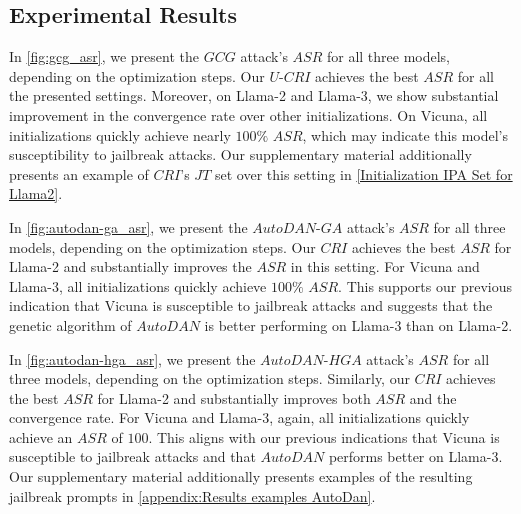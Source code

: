 \subsection{Experimental Results}
\label{subsec:exp_results}

In \cref{fig:gcg_asr}, we present the $GCG$ attack’s $ASR$ for all three models, depending on the optimization steps. Our $U\text{-}CRI$ achieves the best $ASR$ for all the presented settings. Moreover, on Llama-2 and Llama-3, we show substantial improvement in the convergence rate over other initializations. On Vicuna, all initializations quickly achieve nearly $100\%$ $ASR$, which may indicate this model's susceptibility to jailbreak attacks. Our supplementary material additionally presents an example of $CRI$'s $JT$ set over this setting in \cref{Initialization IPA Set for Llama2}.

In \cref{fig:autodan-ga_asr}, we present the $AutoDAN\text{-}GA$ attack’s $ASR$ for all three models, depending on the optimization steps. Our $CRI$ achieves the best $ASR$ for Llama-2 and substantially improves the $ASR$ in this setting. For Vicuna and Llama-3, all initializations quickly achieve $100\%$ $ASR$. This supports our previous indication that Vicuna is susceptible to jailbreak attacks and suggests that the genetic algorithm of $AutoDAN$ is better performing on Llama-3 than on Llama-2.

In \cref{fig:autodan-hga_asr}, we present the $AutoDAN\text{-}HGA$ attack’s $ASR$ for all three models, depending on the optimization steps. Similarly, our $CRI$ achieves the best $ASR$ for Llama-2 and substantially improves both $ASR$ and the convergence rate. For Vicuna and Llama-3, again, all initializations quickly achieve an $ASR$ of $100$. This aligns with our previous indications that Vicuna is susceptible to jailbreak attacks and that $AutoDAN$ performs better on Llama-3. Our supplementary material additionally presents examples of the resulting jailbreak prompts in \cref{appendix:Results examples AutoDan}.

